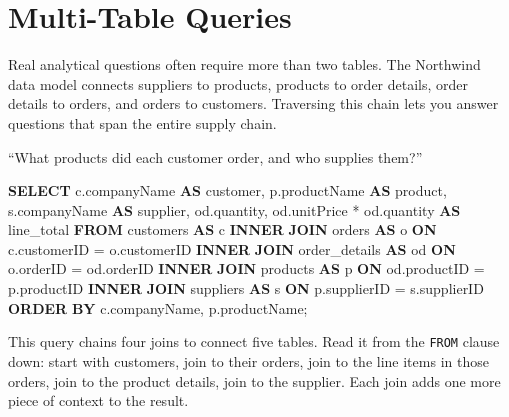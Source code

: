 \documentclass[
  letterpaper,
  DIV=11,
  numbers=noendperiod]{scrreprt}
\newenvironment{Shaded}{\begin{snugshade}}{\end{snugshade}}
\newcommand{\KeywordTok}[1]{\textcolor[rgb]{0.00,0.23,0.31}{\textbf{#1}}}
\newcommand{\NormalTok}[1]{\textcolor[rgb]{0.00,0.23,0.31}{#1}}
\newcommand{\OperatorTok}[1]{\textcolor[rgb]{0.37,0.37,0.37}{#1}}
\begin{document}
\section{Multi-Table Queries}\label{multi-table-queries}

Real analytical questions often require more than two tables. The
Northwind data model connects suppliers to products, products to order
details, order details to orders, and orders to customers. Traversing
this chain lets you answer questions that span the entire supply chain.

``What products did each customer order, and who supplies them?''

\begin{codelisting}

\caption{\texttt{duckdb}}

\begin{Shaded}
\begin{Highlighting}[]
\KeywordTok{SELECT}
\NormalTok{    c.companyName }\KeywordTok{AS}\NormalTok{ customer,}
\NormalTok{    p.productName }\KeywordTok{AS}\NormalTok{ product,}
\NormalTok{    s.companyName }\KeywordTok{AS}\NormalTok{ supplier,}
\NormalTok{    od.quantity,}
\NormalTok{    od.unitPrice }\OperatorTok{*}\NormalTok{ od.quantity }\KeywordTok{AS}\NormalTok{ line\_total}
\KeywordTok{FROM}\NormalTok{ customers }\KeywordTok{AS}\NormalTok{ c}
\KeywordTok{INNER} \KeywordTok{JOIN}\NormalTok{ orders }\KeywordTok{AS}\NormalTok{ o}
    \KeywordTok{ON}\NormalTok{ c.customerID }\OperatorTok{=}\NormalTok{ o.customerID}
\KeywordTok{INNER} \KeywordTok{JOIN}\NormalTok{ order\_details }\KeywordTok{AS}\NormalTok{ od}
    \KeywordTok{ON}\NormalTok{ o.orderID }\OperatorTok{=}\NormalTok{ od.orderID}
\KeywordTok{INNER} \KeywordTok{JOIN}\NormalTok{ products }\KeywordTok{AS}\NormalTok{ p}
    \KeywordTok{ON}\NormalTok{ od.productID }\OperatorTok{=}\NormalTok{ p.productID}
\KeywordTok{INNER} \KeywordTok{JOIN}\NormalTok{ suppliers }\KeywordTok{AS}\NormalTok{ s}
    \KeywordTok{ON}\NormalTok{ p.supplierID }\OperatorTok{=}\NormalTok{ s.supplierID}
\KeywordTok{ORDER} \KeywordTok{BY}\NormalTok{ c.companyName, p.productName;}
\end{Highlighting}
\end{Shaded}

\end{codelisting}

This query chains four joins to connect five tables. Read it from the
\texttt{FROM} clause down: start with customers, join to their orders,
join to the line items in those orders, join to the product details,
join to the supplier. Each join adds one more piece of context to the
result.
\end{document}
